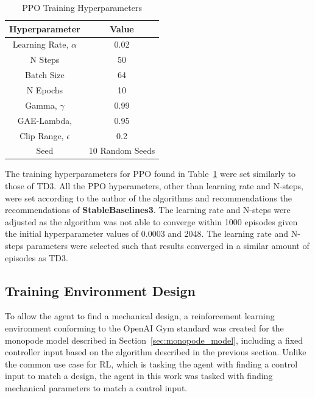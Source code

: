 \documentclass[10pt,twocolumn,letterpaper]{article}
\begin{document}
%
%
\begin{table}[t]
        \caption{PPO Training Hyperparameters}
        \vspace{-4mm}
        \label{tab:training_hyperameters_PPO}
        \begin{center}
        \begin{tabular}{|c||c|}
        \hline
        Hyperparameter                  & Value                           \\
        \hline
        Learning Rate, $\alpha$         & 0.02                            \\
        N Steps                         & 50                              \\
        Batch Size                      & 64                              \\
        N Epochs                        & 10                              \\
        Gamma, $\gamma$                 & 0.99                            \\
        GAE-Lambda,                     & 0.95                            \\
        Clip Range, $\epsilon $         & 0.2                             \\
        Seed                            & 10 Random Seeds                 \\
        \hline
        \end{tabular}
        \end{center}
        \vspace{-5mm}
\end{table}
%

The training hyperparameters for PPO found in Table~\ref{tab:training_hyperameters_PPO} were set similarly to those of TD3. All the PPO hyperameters, other than learning rate and N-steps, were set according to the author of the algorithms and recommendations the recommendations of \textbf{StableBaselines3}.
The learning rate and N-steps were adjusted as the algorithm was not able to converge within 1000 episodes given the initial hyperparameter values of 0.0003 and 2048. The learning rate and N-steps parameters were selected such that results converged in a similar amount of
episodes as TD3.

\subsection{Training Environment Design}
%
To allow the agent to find a mechanical design, a reinforcement learning environment conforming to the OpenAI Gym standard \cite{Brockman2016c} was created for the monopode model described in Section~\ref{sec:monopode_model}, including a fixed controller input based on the algorithm described in the previous section. Unlike the common use case for RL, which is tasking the agent with finding a control input to match a design, the agent in this work was tasked with finding mechanical parameters to match a control input.
\end{document}
